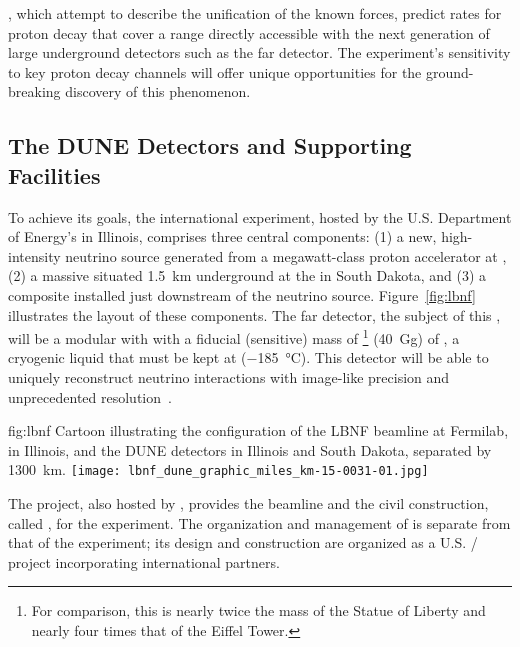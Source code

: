 , which attempt to describe the unification of the known forces, predict rates for proton decay that cover a range directly accessible with the next generation of large underground detectors such as the  far detector. The experiment's sensitivity to key proton decay channels will offer unique opportunities for the ground-breaking discovery of this phenomenon.

\subsection{The DUNE Detectors and Supporting Facilities}
\label{sec:exec-overall-det-sppt}


To achieve its goals, the international  experiment, hosted by the U.S. Department of Energy's  in Illinois, comprises three central components: (1) a new, high-intensity neutrino source generated from a megawatt-class proton accelerator at , (2)  a massive  situated \SI{1.5}{\km} underground at the  in South Dakota, and (3) a composite  installed just downstream of the neutrino source. 
Figure~\ref{fig:lbnf} illustrates the layout of these components. The far detector, the subject of this , will be a modular  with 
with a fiducial (sensitive) mass of
\fdfiducialmass{}\footnote{For comparison, this is nearly twice the mass of the Statue of Liberty and nearly four times that of the Eiffel Tower.} 
(\SI{40}{\giga\gram}) 
of , a cryogenic liquid that must be kept at \lartemp{} (\SI{-185}{\degree}C). This detector will be able to  uniquely reconstruct neutrino interactions with image-like precision and unprecedented resolution~\cite{Adams:2013qkq}. 

\begin{dunefigure}{fig:lbnf}{ 	
Cartoon illustrating the configuration of the LBNF beamline at Fermilab, in Illinois, and the DUNE detectors in Illinois and South Dakota, separated by \SI{1300}{km}.}
\texttt{[image: lbnf\_dune\_graphic\_miles\_km-15-0031-01.jpg]}
\end{dunefigure}



The  project, also hosted by , provides the beamline and the civil construction, called , for the  experiment.  
The organization and management of  is separate from that of the experiment; its design and construction are organized as a U.S. / project incorporating international partners. 


